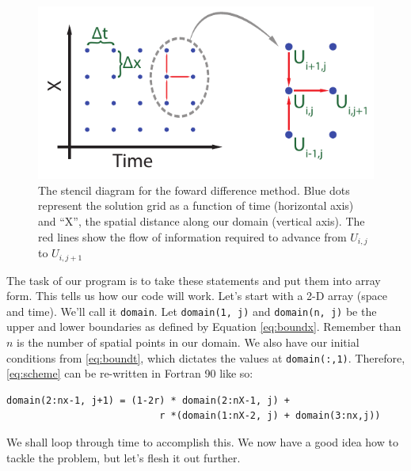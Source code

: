 \documentclass[11pt, letterpaper]{article}
\begin{document}
\begin{figure}[ht!]
  \centering
  \includegraphics{./heateq_fwddiff.pdf}
  \caption{The stencil diagram for the foward difference method.  Blue dots
    represent the solution grid as a function of time (horizontal axis)
    and ``X'', the
    spatial distance along our domain (vertical axis).  The red lines show
    the flow of information required to advance from $U_{i,j}$ to $U_{i,j+1}$}  
  \label{fig:sten}
\end{figure}


The task of our program is to take these statements and put them into array form.
This tells us how our code will work.  Let's start with a 2-D array (space and
time).  We'll call it {\tt domain}.  Let {\tt domain(1, j)} and
{\tt domain(n, j)} be the upper and lower boundaries as defined by
Equation \ref{eq:boundx}.  Remember than $n$ is the number of spatial points in
our domain.  We also have our initial conditions from \ref{eq:boundt}, which
dictates the values at {\tt domain(:,1)}.  Therefore, \ref{eq:scheme} can
be re-written in Fortran 90 like so:

\begin{verbatim}
domain(2:nx-1, j+1) = (1-2r) * domain(2:nX-1, j) + 
                           r *(domain(1:nX-2, j) + domain(3:nx,j))
\end{verbatim}

We shall loop through time to accomplish this.  We now have a good idea how to
tackle the problem, but let's flesh it out further.
\end{document}
